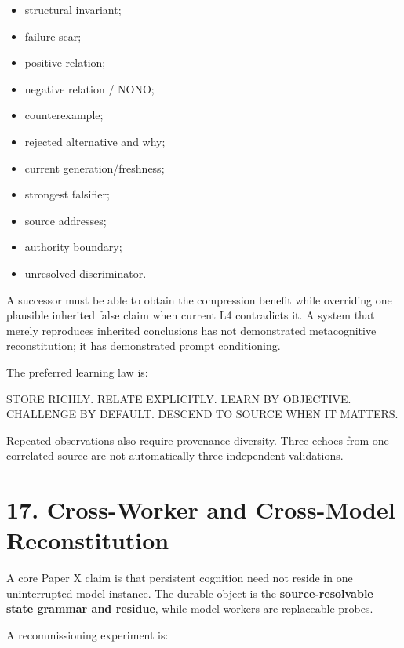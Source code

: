 \documentclass[
  10pt,
  letterpaper,
]{article}
\newenvironment{Shaded}{}{}
\newcommand{\NormalTok}[1]{#1}
\providecommand{\tightlist}{%
  \setlength{\itemsep}{0pt}\setlength{\parskip}{0pt}}
\begin{document}
\begin{itemize}
\tightlist
\item
  structural invariant;
\item
  failure scar;
\item
  positive relation;
\item
  negative relation / NONO;
\item
  counterexample;
\item
  rejected alternative and why;
\item
  current generation/freshness;
\item
  strongest falsifier;
\item
  source addresses;
\item
  authority boundary;
\item
  unresolved discriminator.
\end{itemize}

A successor must be able to obtain the compression benefit while
overriding one plausible inherited false claim when current L4
contradicts it. A system that merely reproduces inherited conclusions
has not demonstrated metacognitive reconstitution; it has demonstrated
prompt conditioning.

The preferred learning law is:

\begin{Shaded}
\begin{Highlighting}[]
\NormalTok{STORE RICHLY.}
\NormalTok{RELATE EXPLICITLY.}
\NormalTok{LEARN BY OBJECTIVE.}
\NormalTok{CHALLENGE BY DEFAULT.}
\NormalTok{DESCEND TO SOURCE WHEN IT MATTERS.}
\end{Highlighting}
\end{Shaded}

Repeated observations also require provenance diversity. Three echoes
from one correlated source are not automatically three independent
validations.

\section{17. Cross-Worker and Cross-Model
Reconstitution}\label{17-cross-worker-and-cross-model-reconstitution}

A core Paper X claim is that persistent cognition need not reside in one
uninterrupted model instance. The durable object is the
\textbf{source-resolvable state grammar and residue}, while model
workers are replaceable probes.

A recommissioning experiment is:
\end{document}
